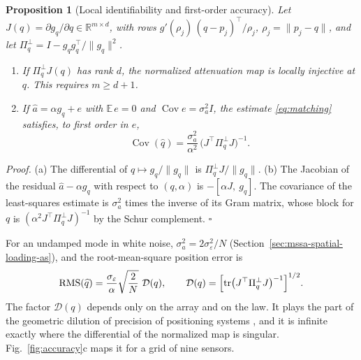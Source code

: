 \documentclass{article}
\newtheorem{proposition}{\bf Proposition}
\begin{document}
\begin{proposition}[Local identifiability and first-order accuracy] \label{prop:accuracy}
Let $J(q) = \partial g_q / \partial q \in \mathbb{R}^{m \times d}$, with rows $g'(\rho_j)\,(q - p_j)^{\top} / \rho_j$, $\rho_j = \lVert p_j - q \rVert$, and let $\Pi_q^{\perp} = I - g_q g_q^{\top} / \lVert g_q \rVert^{2}$.

\begin{enumerate}
\renewcommand{\labelenumi}{(\alph{enumi})}
\item
  If $\Pi_q^{\perp} J(q)$ has rank $d$, the normalized attenuation map is locally injective at $q$. This requires $m \ge d + 1$.
\item
  If $\widehat{a} = \alpha g_q + e$ with $\mathbb{E}\, e = 0$ and $\operatorname{Cov} e = \sigma_a^{2} I$, the estimate \eqref{eq:matching} satisfies, to first order in $e$, 
\begin{equation} \label{eq:accuracy}
\operatorname{Cov}(\widehat{q}) = \frac{\sigma_a^{2}}{\alpha^{2}}\, \bigl(J^{\top} \Pi_q^{\perp} J\bigr)^{-1}.
\end{equation}
\end{enumerate}
\end{proposition}

\textit{Proof.} (a) The differential of $q \mapsto g_q / \lVert g_q \rVert$ is $\Pi_q^{\perp} J / \lVert g_q \rVert$. (b) The Jacobian of the residual $\widehat{a} - \alpha g_q$ with respect to $(q, \alpha)$ is $-[\alpha J,\ g_q]$. The covariance of the least-squares estimate is $\sigma_a^{2}$ times the inverse of its Gram matrix, whose block for $q$ is $(\alpha^{2} J^{\top} \Pi_q^{\perp} J)^{-1}$ by the Schur complement. $\square$

For an undamped mode in white noise, $\sigma_a^{2} = 2\sigma_\varepsilon^{2}/N$ (Section~\ref{sec:mssa-spatial-loading-as}), and the root-mean-square position error is \[
\mathrm{RMS}(\widehat{q}) = \frac{\sigma_\varepsilon}{\alpha} \sqrt{\frac{2}{N}}\ \mathcal{D}(q), \qquad \mathcal{D}(q) = \Bigl[\operatorname{tr}\bigl(J^{\top} \Pi_q^{\perp} J\bigr)^{-1}\Bigr]^{1/2}.
\] The factor $\mathcal{D}(q)$ depends only on the array and on the law. It plays the part of the geometric dilution of precision of positioning systems \cite{ref-Torrieri}, and it is infinite exactly where the differential of the normalized map is singular. Fig.~\ref{fig:accuracy}c maps it for a grid of nine sensors.
\end{document}
